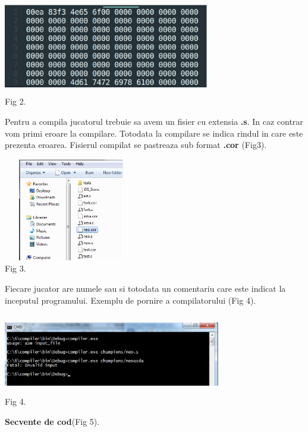 \begin{center}
\includegraphics[width=9cm, height=4.2cm]{10.eps}
~\\
Fig 2.
\end{center}

\tab Pentru a compila jucatorul trebuie sa avem un fisier cu extensia \textbf{.s}. In caz contrar vom primi
eroare la compilare. Totodata la compilare se indica rindul in care este prezenta eroarea. Fisierul compilat
se pastreaza sub format \textbf{.cor} (Fig3).


\begin{center}
\includegraphics[width=5.9cm, height=4.5cm]{3.eps}
~\\
Fig 3.
\end{center}

Fiecare jucator are numele sau si totodata un comentariu care este indicat la inceputul programului.
Exemplu de pornire a compilatorului (Fig 4).

\begin{center}
\includegraphics[width=9.5cm, height=3.5cm]{2.eps}
~\\
Fig 4.
\end{center}
\clearpage


\textbf{Secvente de cod}(Fig 5).


